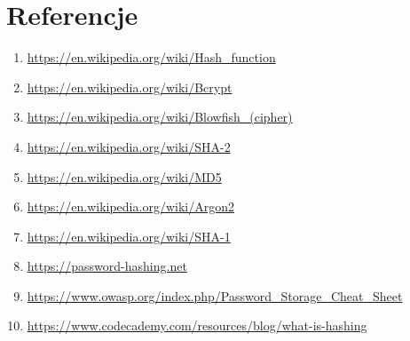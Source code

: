 \documentclass{article}
\begin{document}
    \section{Referencje}
    \label{section:references}
        \begin{enumerate}
            \item \url{https://en.wikipedia.org/wiki/Hash\_function}
            \item \url{https://en.wikipedia.org/wiki/Bcrypt}
            \item \url{https://en.wikipedia.org/wiki/Blowfish_(cipher)}
            \item \url{https://en.wikipedia.org/wiki/SHA-2}
            \item \url{https://en.wikipedia.org/wiki/MD5}
            \item \url{https://en.wikipedia.org/wiki/Argon2}
            \item \url{https://en.wikipedia.org/wiki/SHA-1}
            \item \url{https://password-hashing.net}
            \item \url{https://www.owasp.org/index.php/Password\_Storage\_Cheat\_Sheet}
            \item \url{https://www.codecademy.com/resources/blog/what-is-hashing}
        \end{enumerate}
\end{document}
